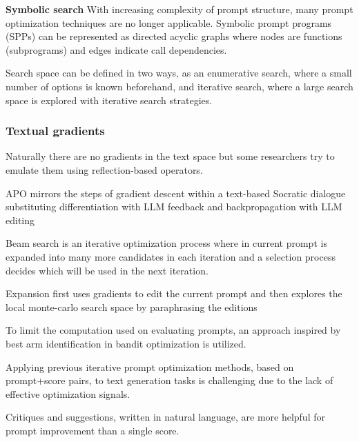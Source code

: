 \textbf{Symbolic search}
With increasing complexity of prompt structure, many prompt optimization techniques are no longer applicable. \cite{schnabel2024symbolicpromptprogramsearch}
Symbolic prompt programs (SPPs) can be represented as directed acyclic graphs where nodes are functions (subprograms) and edges indicate call dependencies. \cite{schnabel2024symbolicpromptprogramsearch}

Search space can be defined in two ways, as an enumerative search, where a small number of options is known beforehand, and iterative search, where a large search space is explored with iterative search strategies. \cite{schnabel2024symbolicpromptprogramsearch}



\subsubsection{Textual gradients}
Naturally there are no gradients in the text space but some researchers try to emulate them using reflection-based operators.

APO mirrors the steps of gradient descent within a text-based Socratic dialogue substituting differentiation with LLM feedback and backpropagation with LLM editing \cite{pryzant2023automaticpromptoptimizationgradient}

Beam search is an iterative optimization process where in current prompt is expanded into many more candidates in each iteration and a selection process decides which will be used in the next iteration. \cite{pryzant2023automaticpromptoptimizationgradient}

Expansion first uses gradients to edit the current prompt and then explores the local monte-carlo search space by paraphrasing the editions \cite{pryzant2023automaticpromptoptimizationgradient}

To limit the computation used on evaluating prompts, an approach inspired by best arm identification in bandit optimization is utilized. \cite{pryzant2023automaticpromptoptimizationgradient}


Applying previous iterative prompt optimization methods, based on prompt+score pairs, to text generation tasks is challenging due to the lack of effective optimization signals. \cite{he2024crispomultiaspectcritiquesuggestionguidedautomatic}

Critiques and suggestions, written in natural language, are more helpful for prompt improvement than a single score.\cite{he2024crispomultiaspectcritiquesuggestionguidedautomatic}

